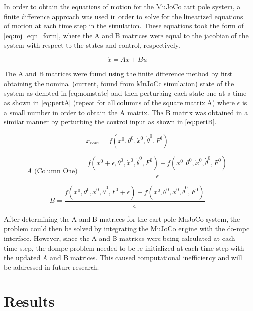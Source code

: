 \documentclass{./springer/svjour3}
\begin{document}
In order to obtain the equations of motion for the MuJoCo cart pole system, a finite difference approach was used in order to solve for the linearized equations of motion at 
each time step in the simulation. These equations took the form of \ref{eq:mj_eqn_form}, where the A and B matrices were equal to the jacobian of the system 
with respect to the states and 
control, respectively.

\begin{equation}
  \dot{x} = Ax + Bu
  \label{eq:mj_eqn_form}
\end{equation}

The A and B matrices were found using the finite difference method by first obtaining the nominal (current, found from MuJoCo simulation)
state of the system as denoted in \ref{eq:nomstate}
and then perturbing each state one at a time as shown in \ref{eq:pertA} (repeat for all columns of the square matrix A) where $\epsilon$
is a small number in order to obtain the A matrix. The B matrix was 
obtained in a similar manner by perturbing the control input as shown in \ref{eq:pertB}.

\begin{equation}
  x_{nom} = f(x^0, \theta^0, \dot{x}^0, \dot{\theta}^0, F^0)
  \label{eq:nomstate}
\end{equation}

\begin{equation}
  A \text{ (Column One)} =\frac{ f(x^0 + \epsilon, \theta^0, \dot{x}^0, \dot{\theta}^0, F^0) - f(x^0, \theta^0, \dot{x}^0, \dot{\theta}^0, F^0)}{\epsilon}
  \label{eq:pertA}
\end{equation}

\begin{equation}
  B =\frac{ f(x^0, \theta^0, \dot{x}^0, \dot{\theta}^0, F^0 + \epsilon) - f(x^0, \theta^0, \dot{x}^0, \dot{\theta}^0, F^0)}{\epsilon}
  \label{eq:pertB}
\end{equation}

After determining the A and B matrices for the cart pole MuJoCo system, the problem could then be solved by integrating the MuJoCo engine with the do-mpc interface.
However, since the A and B matrices were being calculated at each time step, the dompc problem needed to be re-initialized at each time step with the updated A and B matrices.
This caused computational inefficiency and will be addressed in future research.

\section{Results}
\end{document}
